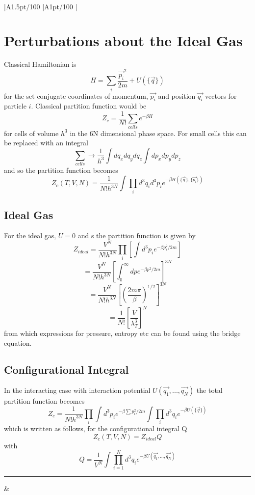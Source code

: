 \documentclass[table,cmyk]{article}
\makeatletter
\newcommand\ratio[2]{\strip@pt\dimexpr#1pt/#2\relax}
\makeatother
\begin{document}
\begin{longtable}
{
    |A{1.5}{\ratio{50}{100}}%
    |A{1}{\ratio{50}{100}}%
    |%
}\hline
\section*{Perturbations about the Ideal Gas}
Classical Hamiltonian is
\[H = \sum_{i} \frac{\vec{p_i}^2}{2m}+U(\{\vec{q}\})\]
for the set conjugate coordinates of momentum, $\vec{p_i}$ and position $\vec{q_i}$ vectors for particle $i$.
Classical partition function would be
\[Z_c = \frac{1}{N!}\sum_{cells} e^{-\beta H}\]
for cells of volume $h^3$ in the 6N dimensional phase space. For small cells this can be replaced with an integral
\[\sum_{cells} \rightarrow \frac{1}{h^3}\int dq_xdq_ydq_z\int dp_xdp_ydp_z\]
and so the partition function becomes
\[Z_c(T,V,N) = \frac{1}{N!h^{3N}}\int \prod_{i} d^3q_id^3p_ie^{-\beta H(\{\vec{q}\},\{\vec{p_i}\})}\]
\subsection*{Ideal Gas}
For the ideal gas, $U = 0$ and s the partition function is given by
\[Z_{ideal} = \frac{V^N}{N!h^{3N}}\prod_{i}\left[ \int d^3p_ie^{-\beta p_i^2/2m}\right] \]
\[= \frac{V^N}{N!h^{3N}}\left[ \int_{0}^{\infty} dp e^{-\beta p^2/2m}\right]^{3N}\]
\[= \frac{V^N}{N!h^{3N}} \left[ \left(\frac{2m\pi }{\beta}\right)^{1/2}\right]^{3N}\]
\[=\frac{1}{N!}\left[ \frac{V}{\lambda_T^3}\right]^N\]
from which expressions for pressure, entropy etc can be found using the bridge equation.
\subsection*{Configurational Integral}
In the interacting case with interaction potential $U(\vec{q_1},...,\vec{q_N})$
the total partition function becomes
\[Z_c = \frac{1}{N!h^{3N}} \prod_{i} \int d^3p_i e^{-\beta\sum p_i^2/2m}\int \prod_{i} d^3q_i e^{-\beta U(\{\vec{q}\})}\]
which is written as follows, for the configurational integral Q
\[Z_c(T,V,N) = Z_{ideal}Q\]
with
\[Q = \frac{1}{V^N} \int \prod_{i=1}^{N}d^3q_i e^{-\beta U(\vec{q_1},...,\vec{q_N})}\]
\vspace{2cm}

\noindent\rule{9cm}{0.4pt}
&

\end{longtable}
\end{document}
